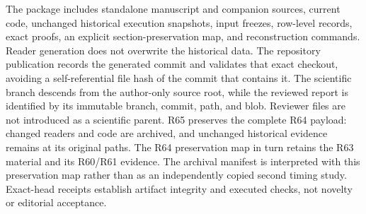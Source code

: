 \documentclass[11pt,letterpaper]{article}
\theoremstyle{definition}\newtheorem{remark}[theorem]{Remark}
\begin{document}
The package includes standalone manuscript and companion sources, current code, unchanged historical execution snapshots, input freezes, row-level records, exact proofs, an explicit section-preservation map, and reconstruction commands. Reader generation does not overwrite the historical data. The repository publication records the generated commit and validates that exact checkout, avoiding a self-referential file hash of the commit that contains it. The scientific branch descends from the author-only source root, while the reviewed report is identified by its immutable branch, commit, path, and blob. Reviewer files are not introduced as a scientific parent. R65 preserves the complete R64 payload: changed readers and code are archived, and unchanged historical evidence remains at its original paths. The R64 preservation map in turn retains the R63 material and its R60/R61 evidence. The archival manifest is interpreted with this preservation map rather than as an independently copied second timing study. Exact-head receipts establish artifact integrity and executed checks, not novelty or editorial acceptance.
\clearpage{}\label{ec-refs-start}
\end{document}
